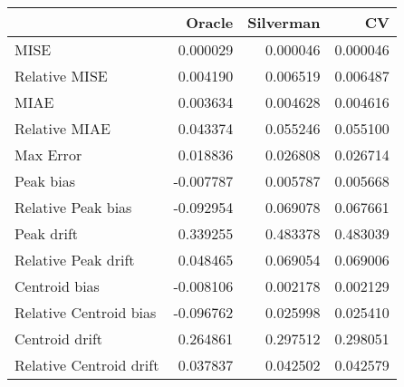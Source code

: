 \begin{tabular}{lrrr}
  \hline
 & Oracle & Silverman & CV \\ 
  \hline
MISE & 0.000029 & 0.000046 & 0.000046 \\ 
  Relative MISE & 0.004190 & 0.006519 & 0.006487 \\ 
  MIAE & 0.003634 & 0.004628 & 0.004616 \\ 
  Relative MIAE & 0.043374 & 0.055246 & 0.055100 \\ 
  Max Error & 0.018836 & 0.026808 & 0.026714 \\ 
  Peak bias & -0.007787 & 0.005787 & 0.005668 \\ 
  Relative Peak bias & -0.092954 & 0.069078 & 0.067661 \\ 
  Peak drift & 0.339255 & 0.483378 & 0.483039 \\ 
  Relative Peak drift & 0.048465 & 0.069054 & 0.069006 \\ 
  Centroid bias & -0.008106 & 0.002178 & 0.002129 \\ 
  Relative Centroid bias & -0.096762 & 0.025998 & 0.025410 \\ 
  Centroid drift & 0.264861 & 0.297512 & 0.298051 \\ 
  Relative Centroid drift & 0.037837 & 0.042502 & 0.042579 \\ 
   \hline
\end{tabular}
